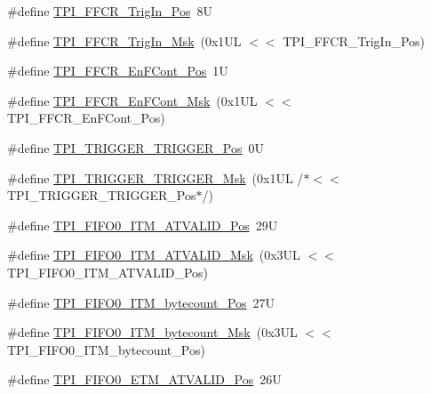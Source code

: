 \begin{DoxyCompactItemize}
\item 
\#define \mbox{\hyperlink{group___c_m_s_i_s___t_p_i_gaa7ea11ba6ea75b541cd82e185c725b5b}{T\+P\+I\+\_\+\+F\+F\+C\+R\+\_\+\+Trig\+In\+\_\+\+Pos}}~8U
\item 
\#define \mbox{\hyperlink{group___c_m_s_i_s___t_p_i_ga360b413bc5da61f751546a7133c3e4dd}{T\+P\+I\+\_\+\+F\+F\+C\+R\+\_\+\+Trig\+In\+\_\+\+Msk}}~(0x1\+U\+L $<$$<$ T\+P\+I\+\_\+\+F\+F\+C\+R\+\_\+\+Trig\+In\+\_\+\+Pos)
\item 
\#define \mbox{\hyperlink{group___c_m_s_i_s___t_p_i_ga99e58a0960b275a773b245e2b69b9a64}{T\+P\+I\+\_\+\+F\+F\+C\+R\+\_\+\+En\+F\+Cont\+\_\+\+Pos}}~1U
\item 
\#define \mbox{\hyperlink{group___c_m_s_i_s___t_p_i_ga27d1ecf2e0ff496df03457a2a97cb2c9}{T\+P\+I\+\_\+\+F\+F\+C\+R\+\_\+\+En\+F\+Cont\+\_\+\+Msk}}~(0x1\+U\+L $<$$<$ T\+P\+I\+\_\+\+F\+F\+C\+R\+\_\+\+En\+F\+Cont\+\_\+\+Pos)
\item 
\#define \mbox{\hyperlink{group___c_m_s_i_s___t_p_i_ga5517fa2ced64efbbd413720329c50b99}{T\+P\+I\+\_\+\+T\+R\+I\+G\+G\+E\+R\+\_\+\+T\+R\+I\+G\+G\+E\+R\+\_\+\+Pos}}~0U
\item 
\#define \mbox{\hyperlink{group___c_m_s_i_s___t_p_i_ga814227af2b2665a0687bb49345e21110}{T\+P\+I\+\_\+\+T\+R\+I\+G\+G\+E\+R\+\_\+\+T\+R\+I\+G\+G\+E\+R\+\_\+\+Msk}}~(0x1\+U\+L /$\ast$$<$$<$ T\+P\+I\+\_\+\+T\+R\+I\+G\+G\+E\+R\+\_\+\+T\+R\+I\+G\+G\+E\+R\+\_\+\+Pos$\ast$/)
\item 
\#define \mbox{\hyperlink{group___c_m_s_i_s___t_p_i_gaa7e050e9eb6528241ebc6835783b6bae}{T\+P\+I\+\_\+\+F\+I\+F\+O0\+\_\+\+I\+T\+M\+\_\+\+A\+T\+V\+A\+L\+I\+D\+\_\+\+Pos}}~29U
\item 
\#define \mbox{\hyperlink{group___c_m_s_i_s___t_p_i_ga94cb2493ed35d2dab7bd4092b88a05bc}{T\+P\+I\+\_\+\+F\+I\+F\+O0\+\_\+\+I\+T\+M\+\_\+\+A\+T\+V\+A\+L\+I\+D\+\_\+\+Msk}}~(0x3\+U\+L $<$$<$ T\+P\+I\+\_\+\+F\+I\+F\+O0\+\_\+\+I\+T\+M\+\_\+\+A\+T\+V\+A\+L\+I\+D\+\_\+\+Pos)
\item 
\#define \mbox{\hyperlink{group___c_m_s_i_s___t_p_i_gac2b6f7f13a2fa0be4aa7645a47dcac52}{T\+P\+I\+\_\+\+F\+I\+F\+O0\+\_\+\+I\+T\+M\+\_\+bytecount\+\_\+\+Pos}}~27U
\item 
\#define \mbox{\hyperlink{group___c_m_s_i_s___t_p_i_ga07bafa971b8daf0d63b3f92b9ae7fa16}{T\+P\+I\+\_\+\+F\+I\+F\+O0\+\_\+\+I\+T\+M\+\_\+bytecount\+\_\+\+Msk}}~(0x3\+U\+L $<$$<$ T\+P\+I\+\_\+\+F\+I\+F\+O0\+\_\+\+I\+T\+M\+\_\+bytecount\+\_\+\+Pos)
\item 
\#define \mbox{\hyperlink{group___c_m_s_i_s___t_p_i_ga7fdeb3e465ca4aa9e3b2f424ab3bbd1d}{T\+P\+I\+\_\+\+F\+I\+F\+O0\+\_\+\+E\+T\+M\+\_\+\+A\+T\+V\+A\+L\+I\+D\+\_\+\+Pos}}~26U

\end{DoxyCompactItemize}
